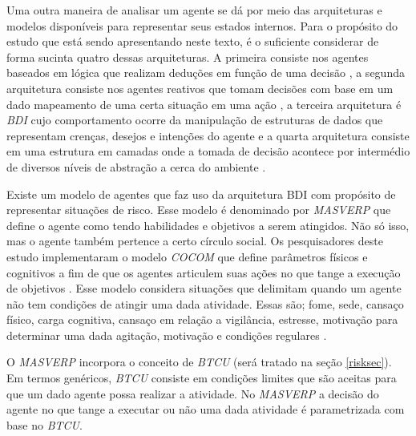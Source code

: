 Uma outra maneira de analisar um agente se dá por meio das arquiteturas e modelos disponíveis para representar seus estados internos. Para o propósito do estudo que está sendo apresentando neste texto, é o suficiente considerar de forma sucinta quatro dessas arquiteturas. A primeira consiste nos agentes baseados em lógica que realizam deduções em função de uma decisão \cite{logicagent}, a segunda arquitetura consiste nos agentes reativos que tomam decisões com base em um dado mapeamento de uma certa situação em uma  ação \cite{reactiveagent}, a terceira arquitetura é \textit{BDI} cujo comportamento ocorre da manipulação de estruturas de dados que representam crenças, desejos e intenções do agente \cite{bdi} e a quarta arquitetura consiste em uma estrutura em camadas onde a tomada de decisão acontece por intermédio de diversos níveis de abstração a cerca do ambiente \cite{layeragent} \cite{whatisagent}.  

Existe um modelo de agentes que faz uso da arquitetura BDI com propósito de representar situações de risco. Esse modelo é denominado por \textit{MASVERP} que define o agente como tendo habilidades e objetivos a serem atingidos. Não só isso, mas o agente também pertence a certo círculo social. Os pesquisadores deste estudo implementaram o modelo \textit{COCOM} que define parâmetros físicos e cognitivos a fim de que os agentes articulem suas ações no que tange a execução de objetivos \cite{mavesp}. Esse modelo considera situações que delimitam quando um agente não tem condições de atingir uma dada atividade. Essas são; fome, sede, cansaço físico, carga cognitiva, cansaço em relação a vigilância, estresse, motivação para determinar uma dada agitação, motivação e condições regulares \cite{mavesp}. 

O \textit{MASVERP} incorpora o conceito de \textit{BTCU} (será tratado na seção \ref{risksec}). Em termos genéricos, \textit{BTCU} consiste em condições limites que são aceitas para que um dado agente possa realizar a atividade. No \textit{MASVERP} a decisão do agente no que tange a executar ou não uma dada atividade é parametrizada com base no \textit{BTCU}. 